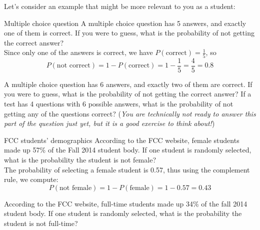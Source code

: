 Let's consider an example that might be more relevant to you as a student: 

\begin{example}[https://www.youtube.com/watch?v=munZCN0L2uA]{Multiple choice question}
A multiple choice question has 5 answers, and exactly one of them is correct. If you were to guess, what is the probability of not getting the correct answer? \\

 Since only one of the answers is correct, we have $P(\mbox{correct}) = \frac{1}{5}$, so
\[  P(\mbox{not correct}) = 1 - P(\mbox{correct}) = 1 - \frac{1}{5} = \frac{4}{5} = 0.8 \]
\end{example}

\begin{try}
A multiple choice question has 6 answers, and exactly two of them are correct. If you were to guess, what is the probability of not getting the correct answer?  If a test has 4 questions with 6 possible answers, what is the probability of not getting any of the questions correct? (\emph{You are technically not ready to answer this part of the question just yet, but it is a good exercise to think about!})
\end{try}

\begin{example}[https://www.youtube.com/watch?v=ICbVL7wFRYU]{FCC students' demographics}
According to the FCC website, female students made up 57\% of the Fall 2014 student body. If one student is randomly selected, what is the probability the student is not female? \\

 The probability of selecting a female student is 0.57, thus using the complement rule, we compute:
\[ P(\mbox{not female}) = 1 - P(\mbox{female}) = 1 - 0.57 = 0.43 \]
\end{example}

\begin{try}
According to the FCC website, full-time students made up 34\% of the fall 2014 student body. If one student is randomly selected, what is the probability the student is not full-time? \\
\end{try}
\vfill
\pagebreak

